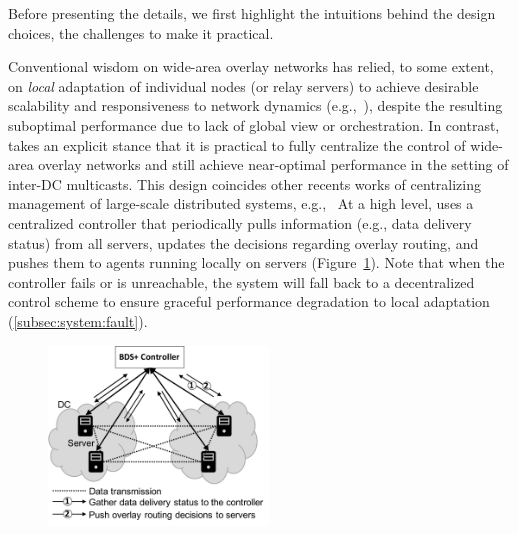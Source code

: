  Before presenting the details, we first highlight the intuitions behind the design choices, the challenges to make it practical.


Conventional wisdom on wide-area overlay networks has relied, to
some extent, on {\em local} adaptation of individual nodes (or
relay servers) to achieve desirable scalability and responsiveness
to network dynamics
(e.g.,~\cite{Andreev2013Designing,Repantis2010Scaling,Huang2014A,mukerjee2014enabling}),
despite the resulting suboptimal performance due to lack of global
view or orchestration.
In contrast, \name takes an explicit stance that it is practical to
fully centralize the control of wide-area overlay networks and
still achieve near-optimal performance in the setting of inter-DC
multicasts. This design coincides other recents works of centralizing
management of large-scale distributed systems, e.g.,~\cite{gog2016firmament}
At a high level, \name uses a centralized controller that
periodically pulls information (e.g., data delivery status) from all
servers, updates the decisions regarding overlay routing, and pushes
them to agents running locally on servers
(Figure~\ref{fig:framework}).
Note that when the controller fails or is unreachable, the system will
fall back to a decentralized control scheme to ensure graceful
performance degradation to local adaptation
(\Section\ref{subsec:system:fault}).

\begin{figure}[t]
  \centering
  \includegraphics[width=2.3in]{images/framework-journal.pdf}
    \vspace{-0.2cm}
  \label{fig:framework}
\vspace{-0.4cm}
\end{figure}

